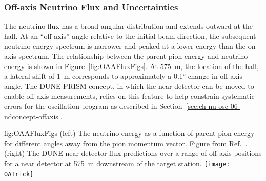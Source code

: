 \subsubsection{Off-axis Neutrino Flux and Uncertainties}



The neutrino flux has a broad angular distribution and extends outward at the  hall. At an ``off-axis'' angle relative to the initial beam direction, the subsequent neutrino energy spectrum is narrower and peaked at a lower energy than the on-axis spectrum.
The relationship between the parent pion energy and neutrino energy is shown in Figure~\ref{fig:OAAFluxFigs}.  At \SI{575}{m}, the location of the  hall, a lateral shift of \SI{1}{m} corresponds to approximately a \ang{0.1} change in off-axis angle. 
The DUNE-PRISM concept, in which the near detector \lartpc can be moved to enable  off-axis measurements, relies on this feature to help constrain systematic errors for the  oscillation program as described in Section~\ref{sec:ch-nu-osc-06-ndconcept-offaxis}.

\begin{dunefigure} %
{fig:OAAFluxFigs}
{(left) The neutrino energy as a function of parent pion energy for different angles away from the pion momentum vector. Figure from Ref.~\cite{Duffy:2016owt}. (right) The DUNE near detector flux predictions over a range of off-axis positions for a near detector at \SI{575}{m} downstream of the target station. }
    \texttt{[image: OATrick]}
\end{dunefigure}

